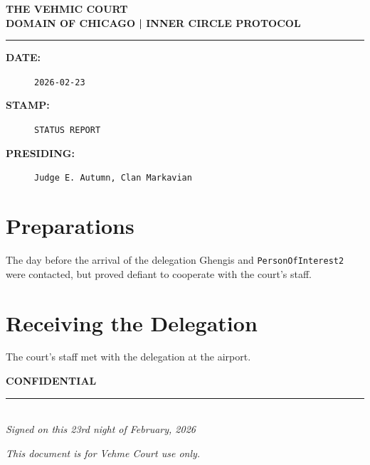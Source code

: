 \documentclass[11pt,a4paper]{article}
\begin{document}
\begin{center}
    {\Huge \color{KindredRed} \textbf{THE VEHMIC COURT}} \\
    \vspace{0.5em}
    {\large \textbf{DOMAIN OF CHICAGO | INNER CIRCLE PROTOCOL}} \\
    \rule{\textwidth}{1pt}
\end{center}

\vspace{1em}

\begin{description}
    \item[\color{KindredRed}\textbf{DATE:}] \texttt{2026-02-23}
    \item[\color{KindredRed}\textbf{STAMP:}] \texttt{STATUS REPORT}
    \item[\color{KindredRed}\textbf{PRESIDING:}] \texttt{Judge E. Autumn, Clan Markavian}
\end{description}

\vspace{1.5em}

\linenumbers



\section{Preparations}

The day before the arrival of the delegation Ghengis and \texttt{PersonOfInterest2} were contacted, but proved defiant to cooperate with the court's staff.


\section{Receiving the Delegation}

The court's staff met with the delegation at the airport.


\nolinenumbers

\vspace{4em}

\begin{flushleft}
    \color{KindredRed}\textbf{CONFIDENTIAL} \\
    \vspace{2em}
    \rule{6cm}{0.5pt} \\
    \textit{Signed on this 23rd night of February, 2026}
\end{flushleft}

\vfill
\begin{center}
    \footnotesize \textit{This document is for Vehme Court use only.}
\end{center}
\end{document}
